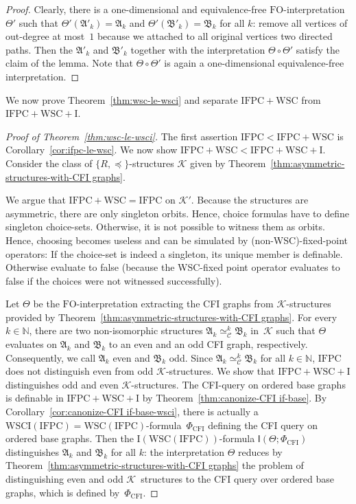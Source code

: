 \documentclass[]{lmcs}
\newcommand{\nat}{\mathbb{N}}
\newcommand{\set}[1]{\lbrace #1 \rbrace}
\newcommand{\formA}{\Phi}
\newcommand{\interpret}{\Theta}
\newcommand{\Struct}{\mathfrak{A}}
\newcommand{\spleq}{\preceq}
\newcommand{\StructA}{\mathfrak{A}}
\newcommand{\StructB}{\mathfrak{B}}
\newcommand{\GraphClass}{\mathcal{K}}
\newcommand{\FO}{\ensuremath{\mathrm{FO}}}
\newcommand{\IFPC}{\ensuremath{\mathrm{IFPC}}}
\newcommand{\IFPCWSC}{\ensuremath{\mathrm{IFPC{+}WSC}}}
\newcommand{\IFPCWSCI}{\ensuremath{\mathrm{IFPC{+}WSC{+}I}}}
\newcommand{\WSCof}[1]{\mathrm{WSC}(#1)}
\newcommand{\Iof}[1]{\mathrm{I}(#1)}
\newcommand{\WSCIof}[1]{\mathrm{WSCI}(#1)}
\newcommand{\iop}[2]{\mathsf{I}(#1;#2)}
\newcommand{\kequiv}[1]{\simeq^#1_{\mathcal{C}}}
\begin{document}
\begin{proof}
	Clearly, there is a one-dimensional and equivalence-free \FO{}-interpretation~$\interpret'$
	such that $\interpret'(\StructA'_k) = \StructA_k$
	and $\interpret'(\StructB'_k) = \StructB_k$ for all $k$:
	remove all vertices of out-degree at most~$1$
	because we attached to all original vertices two directed paths.
	Then the $\StructA'_k$ and $\StructB'_k$ together with the interpretation
	$\interpret \circ \interpret'$ satisfy the claim of the lemma.
	Note that $\interpret \circ \interpret'$ is again a one-dimensional
	equivalence-free interpretation.
\end{proof}


\noindent We now prove Theorem~\ref{thm:wsc-le-wsci}
and separate \IFPCWSC{} from \IFPCWSCI{}.

\begin{proof}[Proof of Theorem~\ref{thm:wsc-le-wsci}]
	The first assertion $\IFPC{} < \IFPCWSC{}$ is Corollary~\ref{cor:ifpc-le-wsc}.
	We now show $\IFPCWSC < \IFPCWSCI{}$.
	Consider the class of $\set{R,\spleq}$-structures $\GraphClass$ given by Theorem~\ref{thm:asymmetric-structures-with-CFI graphs}.
	
	We argue that $\IFPCWSC{}=\IFPC$ on $\GraphClass'$.
	Because the structures are asymmetric, there are only singleton orbits.
	Hence, choice formulas have to define singleton choice-sets. Otherwise, it is not possible to witness them as orbits.
	Hence, choosing becomes useless and can be simulated by (non-WSC)-fixed-point operators: If the choice-set is indeed a singleton,
	its unique member is definable.
	Otherwise evaluate to false (because the WSC-fixed point operator evaluates to false if the choices were not witnessed successfully).


	Let $\interpret$ be the \FO-interpretation
	extracting the CFI graphs from $\GraphClass$-structures provided by Theorem~\ref{thm:asymmetric-structures-with-CFI graphs}.
	For every $k\in \nat$, there are two non-isomorphic structures
	$\StructA_k \kequiv{k} \StructB_k$ in~$\GraphClass$
	such that $\interpret$ evaluates on $\StructA_k$ and $\StructB_k$ to an even and an odd CFI graph, respectively.
	Consequently, we call $\Struct_k$ even and $\StructB_k$ odd.
	Since $\StructA_k \kequiv{k} \StructB_k$ for all $k\in\nat$,
	\IFPC{} does not distinguish even from odd $\GraphClass$\nobreakdash-structures.
	We show  that \IFPCWSCI{} distinguishes odd and even $\GraphClass$-structures.
	The CFI-query on ordered base graphs is definable in \IFPCWSCI{} by Theorem~\ref{thm:canonize-CFI if-base}.
	By Corollary~\ref{cor:canonize-CFI if-base-wsci},
	there is actually a $\WSCIof{\IFPC{}}=\WSCof{\IFPC}$-formula~$\formA_{\text{CFI}}$
	defining the CFI query on ordered base graphs.
	Then the $\Iof{\WSCof{\IFPC}}$-formula
	$\iop{\interpret}{\formA_{\text{CFI}}}$
	distinguishes $\StructA_k$ and $\StructB_k$ for all $k$: the interpretation $\interpret$ reduces by Theorem~\ref{thm:asymmetric-structures-with-CFI graphs}
	the problem of distinguishing even and odd $\GraphClass$~\nobreakdash structures to the  CFI query over ordered base graphs,
	which is defined by~$\formA_{\text{CFI}}$.
\end{proof}
\end{document}
